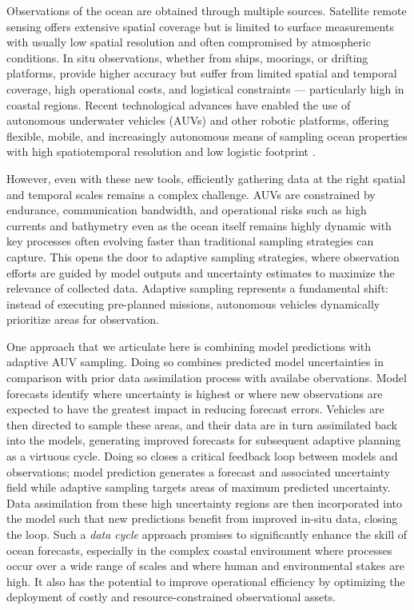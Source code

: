 Observations of the ocean are obtained through multiple sources.
Satellite remote sensing offers extensive spatial coverage but is
limited to surface measurements with usually low spatial resolution
and often compromised by atmospheric conditions. In situ observations,
whether from ships, moorings, or drifting platforms, provide higher
accuracy but suffer from limited spatial and temporal coverage, high
operational costs, and logistical constraints — particularly high in
coastal regions. Recent technological advances have enabled the use of
autonomous underwater vehicles (AUVs) and other robotic platforms,
offering flexible, mobile, and increasingly autonomous means of
sampling ocean properties with high spatiotemporal resolution and low
logistic footprint
\cite{das10,das11b,olaya12,graham12,jdas13,das15,sousa16,fossum18,fossum19b}.

However, even with these new tools, efficiently gathering data at the
right spatial and temporal scales remains a complex challenge. AUVs
are constrained by endurance, communication bandwidth, and operational
risks such as high currents and bathymetry even as the ocean itself
remains highly dynamic with key processes often evolving faster than
traditional sampling strategies can capture. This opens the door to
adaptive sampling strategies, where observation efforts are guided by
model outputs and uncertainty estimates to maximize the relevance of
collected data. Adaptive sampling
\cite{BinZhang07,Singh09,smith14,fossum19} represents a fundamental
shift: instead of executing pre-planned missions, autonomous vehicles
dynamically prioritize areas for observation.

One approach that we articulate here is combining model predictions
with adaptive AUV sampling. Doing so combines predicted model
uncertainties in comparison with prior data assimilation process with
availabe obervations. Model forecasts identify where uncertainty is
highest or where new observations are expected to have the greatest
impact in reducing forecast errors. Vehicles are then directed to
sample these areas, and their data are in turn assimilated back into
the models, generating improved forecasts for subsequent adaptive
planning as a virtuous cycle. Doing so closes a critical feedback loop
between models and observations; model prediction generates a forecast
and associated uncertainty field while adaptive sampling targets areas
of maximum predicted uncertainty. Data assimilation from these high
uncertainty regions are then incorporated into the model such that new
predictions benefit from improved in-situ data, closing the loop.
Such a \textit{data cycle} approach promises to significantly enhance
the skill of ocean forecasts, especially in the complex coastal
environment where processes occur over a wide range of scales and
where human and environmental stakes are high. It also has the
potential to improve operational efficiency by optimizing the
deployment of costly and resource-constrained observational assets.

